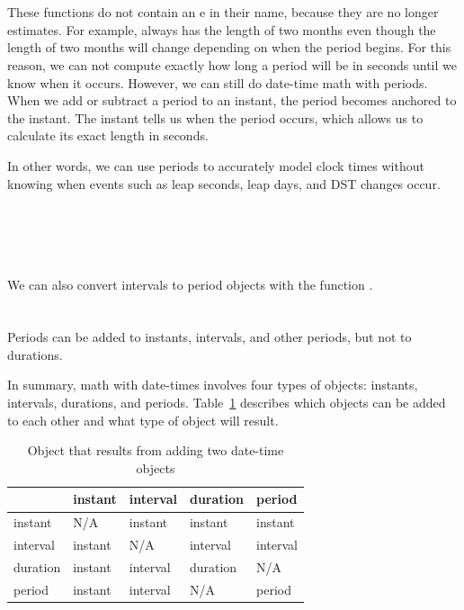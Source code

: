 \documentclass[article]{jss}
\begin{document}
\\
\\

These functions do not contain an e in their name, because they are no longer estimates. For example,  always has the length of two months even though the length of two months will change depending on when the period begins. For this reason, we can not compute exactly how long a period will be in seconds until we know when it occurs. However, we can still do date-time math with periods. When we add or subtract a period to an instant, the period becomes anchored to the instant. The instant tells us when the period occurs, which allows us to calculate its exact length in seconds. 

In other words, we can use periods to accurately model clock times without knowing when events such as leap seconds, leap days, and DST changes occur.

\\
\\

\\
\\

We can also convert intervals to period objects with the function .\\

\\
\\

Periods can be added to instants, intervals, and other periods, but not to durations.


In summary, math with date-times involves four types of objects: instants, intervals, durations, and periods. Table~\ref{tbl:date-math} describes which objects can be added to each other and what type of object will result.

\begin{table}
  \begin{center}
  \begin{tabular}{l|llll}
  & instant & interval & duration & period\\
  \hline
  instant & N/A & instant & instant & instant\\
  interval & instant & N/A & interval & interval\\
  duration & instant & interval & duration & N/A\\
  period & instant & interval & N/A & period\\
  \hline
    
  \end{tabular}
  \end{center}
  \caption{Object that results from adding two date-time objects}
  \label{tbl:date-math}
\end{table}
\end{document}
